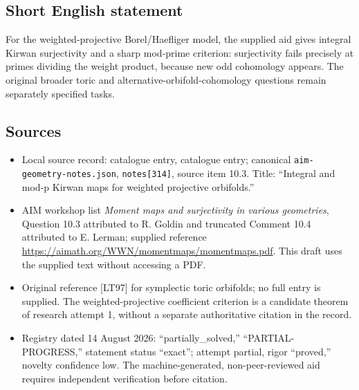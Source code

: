 \documentclass[11pt]{article}
\begin{document}
\subsection{Short English statement}
For the weighted-projective Borel/Haefliger model, the supplied aid gives integral Kirwan surjectivity and a sharp mod-prime criterion: surjectivity fails precisely at primes dividing the weight product, because new odd cohomology appears. The original broader toric and alternative-orbifold-cohomology questions remain separately specified tasks.
\subsection{Sources}
\begin{itemize}
\item Local source record: catalogue entry, catalogue entry; canonical \texttt{aim-geometry-notes.json}, \texttt{notes[314]}, source item 10.3. Title: ``Integral and mod-p Kirwan maps for weighted projective orbifolds.''
\item AIM workshop list \emph{Moment maps and surjectivity in various geometries}, Question 10.3 attributed to R. Goldin and truncated Comment 10.4 attributed to E. Lerman; supplied reference \url{https://aimath.org/WWN/momentmaps/momentmaps.pdf}. This draft uses the supplied text without accessing a PDF.
\item Original reference [LT97] for symplectic toric orbifolds; no full entry is supplied. The weighted-projective coefficient criterion is a candidate theorem of research attempt 1, without a separate authoritative citation in the record.
\item Registry dated 14 August 2026: ``partially\_solved,'' ``PARTIAL-PROGRESS,'' statement status ``exact''; attempt partial, rigor ``proved,'' novelty confidence low. The machine-generated, non-peer-reviewed aid requires independent verification before citation.
\end{itemize}
\end{document}
